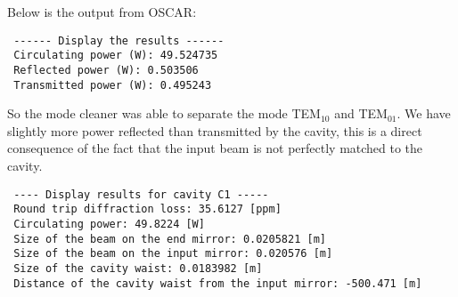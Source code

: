 Below is the output from OSCAR:

\begin{verbatim}
 ------ Display the results ------
 Circulating power (W): 49.524735
 Reflected power (W): 0.503506
 Transmitted power (W): 0.495243
\end{verbatim}

So the mode cleaner was able to separate the mode TEM$_{10}$ and TEM$_{01}$. We have slightly more power reflected than transmitted by the cavity, this is a direct consequence of the fact that the input beam is not perfectly matched to the cavity.

\begin{verbatim}
 ---- Display results for cavity C1 -----
 Round trip diffraction loss: 35.6127 [ppm]
 Circulating power: 49.8224 [W]
 Size of the beam on the end mirror: 0.0205821 [m]
 Size of the beam on the input mirror: 0.020576 [m]
 Size of the cavity waist: 0.0183982 [m]
 Distance of the cavity waist from the input mirror: -500.471 [m]
\end{verbatim}


